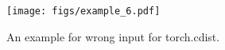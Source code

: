 \begin{figure}
    \centering
    \texttt{[image: figs/example\_6.pdf]}
    \vspace{-7pt}
    \caption{An example for wrong input for torch.cdist.}
    \label{fig:example6}
    \vspace{-10pt}
\end{figure}